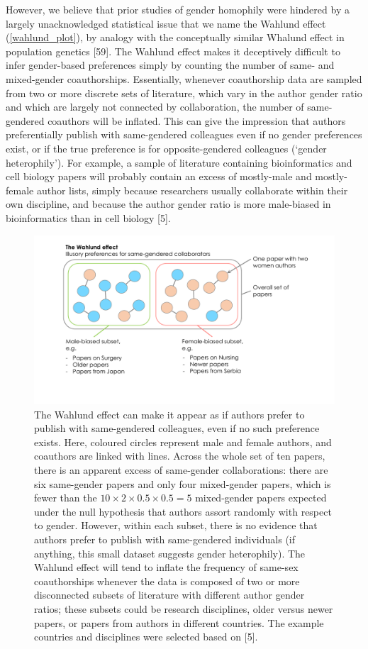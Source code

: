 \documentclass[12pt,]{article}
\begin{document}
However, we believe that prior studies of gender homophily were hindered
by a largely unacknowledged statistical issue that we name the Wahlund
effect (\autoref{wahlund_plot}), by analogy with the conceptually
similar Whalund effect in population genetics {[}59{]}. The Wahlund
effect makes it deceptively difficult to infer gender-based preferences
simply by counting the number of same- and mixed-gender coauthorships.
Essentially, whenever coauthorship data are sampled from two or more
discrete sets of literature, which vary in the author gender ratio and
which are largely not connected by collaboration, the number of
same-gendered coauthors will be inflated. This can give the impression
that authors preferentially publish with same-gendered colleagues even
if no gender preferences exist, or if the true preference is for
opposite-gendered colleagues (`gender heterophily'). For example, a
sample of literature containing bioinformatics and cell biology papers
will probably contain an excess of mostly-male and mostly-female author
lists, simply because researchers usually collaborate within their own
discipline, and because the author gender ratio is more male-biased in
bioinformatics than in cell biology {[}5{]}.

\begin{figure}[htbp]
\centering
\includegraphics{../figures/Fig1.pdf}
\caption{The Wahlund effect can make it appear as if authors prefer to
publish with same-gendered colleagues, even if no such preference
exists. Here, coloured circles represent male and female authors, and
coauthors are linked with lines. Across the whole set of ten papers,
there is an apparent excess of same-gender collaborations: there are six
same-gender papers and only four mixed-gender papers, which is fewer
than the \(10\times2\times0.5\times0.5 = 5\) mixed-gender papers
expected under the null hypothesis that authors assort randomly with
respect to gender. However, within each subset, there is no evidence
that authors prefer to publish with same-gendered individuals (if
anything, this small dataset suggests gender heterophily). The Wahlund
effect will tend to inflate the frequency of same-sex coauthorships
whenever the data is composed of two or more disconnected subsets of
literature with different author gender ratios; these subsets could be
research disciplines, older versus newer papers, or papers from authors
in different countries. The example countries and disciplines were
selected based on {[}5{]}. \label{wahlund_plot}}
\end{figure}
\end{document}
